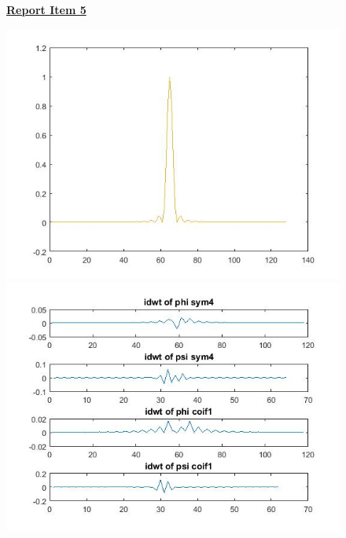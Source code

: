 \documentclass{article}
\begin{document}
\begin{figure}[H]
\color{red}
\underline{\textbf{Report Item 5}}
\color{black}

\includegraphics[scale=.5]{4_same}
\includegraphics[scale=.5]{4_idwt}
\end{figure}
\end{document}
